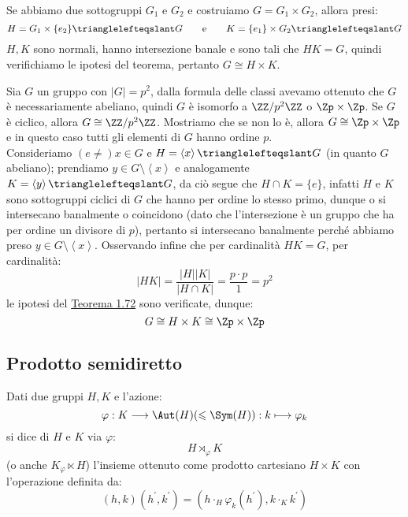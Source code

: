 \documentclass[11pt]{scrartcl}
\begin{document}
\begin{remark}
    Se abbiamo due sottogruppi $G_1$ e $G_2$ e costruiamo $G = G_1 \times G_2$, allora presi:
        \[ H = G_1 \times \{e_2\} \trianglelefteqslant G \qquad \text e \qquad K = \{e_1\} \times G_2 \trianglelefteqslant G
            \]
    $H,K$ sono normali, hanno intersezione banale e sono tali che $HK = G$, quindi verifichiamo le ipotesi del teorema, pertanto $G \cong H \times K$.
\end{remark}

\begin{example}
    Sia $G$ un gruppo con $|G| = p^2$, dalla formula delle classi avevamo ottenuto che $G$ è necessariamente abeliano, quindi $G$ è 
    isomorfo a $\ZZ/p^2\ZZ$ o $\Zp \times \Zp$. Se $G$ è ciclico, allora $G \cong \ZZ/p^2\ZZ$. Mostriamo che se non lo è, allora $G \cong \Zp \times \Zp$ e in 
    questo caso tutti gli elementi di $G$ hanno ordine $p$. \\
    Consideriamo $(e \ne) x \in G$ e $H = \left<x\right> \trianglelefteqslant G$ (in quanto $G$ abeliano); prendiamo $y \in G \setminus\left<x\right>$
    e analogamente $K = \left<y\right> \trianglelefteqslant G$, da ciò segue che $H \cap K = \{e\}$, infatti $H$ e $K$ sono sottogruppi ciclici di $G$
    che hanno per ordine lo stesso primo, dunque o si intersecano banalmente o coincidono (dato che l'intersezione è un gruppo che ha per ordine un divisore di $p$), pertanto si intersecano
    banalmente perché abbiamo preso $y \in G \setminus \left<x\right>$.
    Osservando infine che per cardinalità $HK = G$, per cardinalità:
        \[ |HK| = \frac{|H||K|}{|H \cap K|} = \frac{p\cdot p}{1} = p^2
            \]
    le ipotesi del \hyperref[t:1.72]{Teorema 1.72} sono verificate, dunque:
        \[ G \cong H \times K \cong \Zp \times \Zp
            \]
\end{example}

\newpage
\subsection{Prodotto semidiretto}

\begin{definition}
    Dati due gruppi $H,K$ e l'azione:
        \[ \varphi : K \longrightarrow \Aut(H) (\leqslant \Sym(H)) : k \longmapsto \varphi_k
            \]
    si dice  di $H$ e $K$ via $\varphi$:
        \[ H \rtimes_{\varphi} K
            \]
    (o anche $K {_\varphi}\ltimes H$) l'insieme ottenuto come prodotto cartesiano $H \times K$ con l'operazione definita da:
        \[ (h,k) (h^{\prime},k^{\prime}) = (h \cdot_H \varphi_k(h^{\prime}), k \cdot_K k^{\prime})
            \]
\end{definition}
\end{document}
